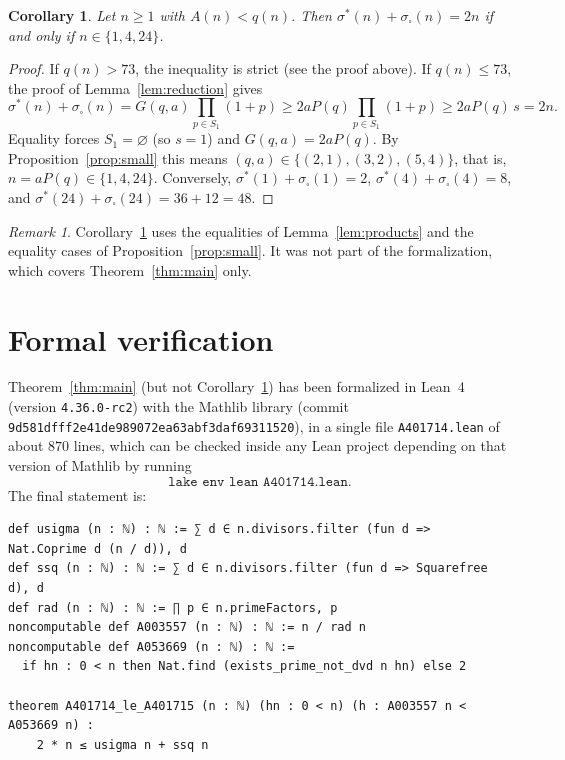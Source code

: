 \documentclass[11pt,a4paper]{amsart}
\newtheorem{corollary}[theorem]{Corollary}
\theoremstyle{definition}
\theoremstyle{remark}
\newtheorem{remark}[theorem]{Remark}
\newcommand{\usig}{\sigma^{*}}
\newcommand{\ssq}{\sigma_{\square}}
\begin{document}
\begin{corollary}\label{cor:equality}
Let $n\ge1$ with $A(n)<q(n)$. Then $\usig(n)+\ssq(n)=2n$ if and only if $n\in\{1,4,24\}$.
\end{corollary}

\begin{proof}
If $q(n)>73$, the inequality is strict (see the proof above). If $q(n)\le73$, the proof of Lemma~\ref{lem:reduction} gives
\[
  \usig(n)+\ssq(n) = G(q,a)\prod_{p\in S_1}(1+p) \ge 2aP(q)\prod_{p\in S_1}(1+p) \ge 2aP(q)\,s = 2n .
\]
Equality forces $S_1=\varnothing$ (so $s=1$) and $G(q,a)=2aP(q)$. By Proposition~\ref{prop:small} this means $(q,a)\in\{(2,1),(3,2),(5,4)\}$, that is, $n = aP(q)\in\{1,4,24\}$. Conversely, $\usig(1)+\ssq(1)=2$, $\usig(4)+\ssq(4)=8$, and $\usig(24)+\ssq(24)=36+12=48$.
\end{proof}

\begin{remark}
Corollary~\ref{cor:equality} uses the equalities of Lemma~\ref{lem:products} and the equality cases of Proposition~\ref{prop:small}. It was not part of the formalization, which covers Theorem~\ref{thm:main} only.
\end{remark}

\section{Formal verification}\label{sec:lean}

Theorem~\ref{thm:main} (but not Corollary~\ref{cor:equality}) has been formalized in Lean~4 (version \texttt{4.36.0-rc2}) with the Mathlib library (commit \texttt{9d581dfff2e41de989072ea63abf3daf69311520}), in a single file \texttt{A401714.lean} of about $870$ lines, which can be checked inside any Lean project depending on that version of Mathlib by running
\[\texttt{lake env lean A401714.lean}.\] The final statement is:

\begin{lstlisting}
def usigma (n : ℕ) : ℕ := ∑ d ∈ n.divisors.filter (fun d => Nat.Coprime d (n / d)), d
def ssq (n : ℕ) : ℕ := ∑ d ∈ n.divisors.filter (fun d => Squarefree d), d
def rad (n : ℕ) : ℕ := ∏ p ∈ n.primeFactors, p
noncomputable def A003557 (n : ℕ) : ℕ := n / rad n
noncomputable def A053669 (n : ℕ) : ℕ :=
  if hn : 0 < n then Nat.find (exists_prime_not_dvd n hn) else 2

theorem A401714_le_A401715 (n : ℕ) (hn : 0 < n) (h : A003557 n < A053669 n) :
    2 * n ≤ usigma n + ssq n
\end{lstlisting}
\end{document}
